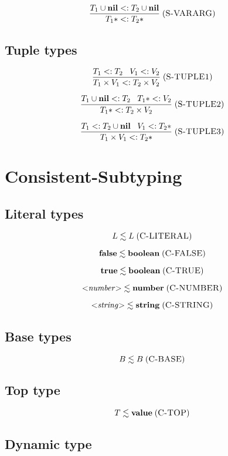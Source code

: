 \documentclass[12pt]{article}
\newcommand{\Top}{\mathbf{value}}
\newcommand{\Nil}{\mathbf{nil}}
\newcommand{\False}{\mathbf{false}}
\newcommand{\True}{\mathbf{true}}
\newcommand{\Boolean}{\mathbf{boolean}}
\newcommand{\Number}{\mathbf{number}}
\newcommand{\String}{\mathbf{string}}
\newcommand{\mylabel}[1]{\; (\textsc{#1})}
\newcommand{\subtype}{<:}
\begin{document}
\[
\frac{T_{1} \cup \Nil \subtype T_{2} \cup \Nil}
     {T_{1}* \subtype T_{2}*}
\mylabel{S-VARARG}
\]

\subsection{Tuple types}

\[
\frac{T_{1} \subtype T_{2} \;\;\; V_{1} \subtype V_{2}}
     {T_{1} \times V_{1} \subtype T_{2} \times V_{2}}
\mylabel{S-TUPLE1}
\]

\[
\frac{T_{1} \cup \Nil \subtype T_{2} \;\;\; T_{1}* \subtype V_{2}}
     {T_{1}* \subtype T_{2} \times V_{2}}
\mylabel{S-TUPLE2}
\]

\[
\frac{T_{1} \subtype T_{2} \cup \Nil \;\;\; V_{1} \subtype T_{2}*}
     {T_{1} \times V_{1} \subtype T_{2}*}
\mylabel{S-TUPLE3}
\]

\section{Consistent-Subtyping}

\subsection{Literal types}

\[
L \lesssim L
\mylabel{C-LITERAL}
\]

\[
\False \lesssim \Boolean
\mylabel{C-FALSE}
\]

\[
\True \lesssim \Boolean
\mylabel{C-TRUE}
\]

\[
{<}{\it number}{>} \lesssim \Number
\mylabel{C-NUMBER}
\]

\[
{<}{\it string}{>} \lesssim \String
\mylabel{C-STRING}
\]

\subsection{Base types}

\[
B \lesssim B
\mylabel{C-BASE}
\]

\subsection{Top type}

\[
T \lesssim \Top
\mylabel{C-TOP}
\]

\subsection{Dynamic type}
\end{document}
